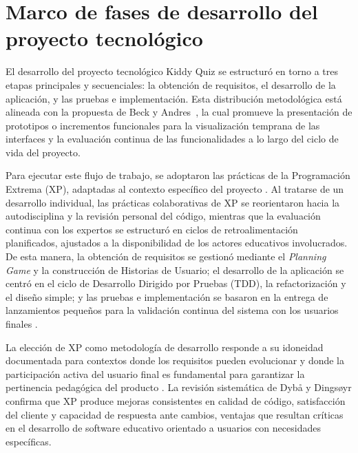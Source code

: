 
\section{Marco de fases de desarrollo del proyecto tecnológico}

El desarrollo del proyecto tecnológico Kiddy Quiz se estructuró en torno a tres etapas principales y secuenciales: la obtención de requisitos, el desarrollo de la aplicación, y las pruebas e implementación. Esta distribución metodológica está alineada con la propuesta de Beck y Andres~\cite{beck2004xp}, la cual promueve la presentación de prototipos o incrementos funcionales para la visualización temprana de las interfaces y la evaluación continua de las funcionalidades a lo largo del ciclo de vida del proyecto.

Para ejecutar este flujo de trabajo, se adoptaron las prácticas de la Programación Extrema (XP), adaptadas al contexto específico del proyecto \cite{beck2004xp,dyba2008agile}. Al tratarse de un desarrollo individual, las prácticas colaborativas de XP se reorientaron hacia la autodisciplina y la revisión personal del código, mientras que la evaluación continua con los expertos se estructuró en ciclos de retroalimentación planificados, ajustados a la disponibilidad de los actores educativos involucrados. De esta manera, la obtención de requisitos se gestionó mediante el \textit{Planning Game} y la construcción de Historias de Usuario; el desarrollo de la aplicación se centró en el ciclo de Desarrollo Dirigido por Pruebas (TDD), la refactorización y el diseño simple; y las pruebas e implementación se basaron en la entrega de lanzamientos pequeños para la validación continua del sistema con los usuarios finales \cite{dyba2008agile,shrivastava2021xpreview}.

La elección de XP como metodología de desarrollo responde a su idoneidad documentada para contextos donde los requisitos pueden evolucionar y donde la participación activa del usuario final es fundamental para garantizar la pertinencia pedagógica del producto \cite{beck2004xp}. La revisión sistemática de Dybå y Dingsøyr \cite{dyba2008agile} confirma que XP produce mejoras consistentes en calidad de código, satisfacción del cliente y capacidad de respuesta ante cambios, ventajas que resultan críticas en el desarrollo de software educativo orientado a usuarios con necesidades específicas.

